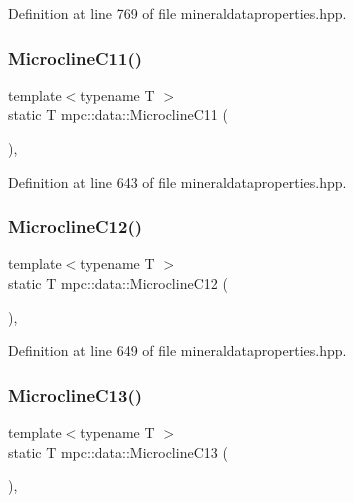 Definition at line 769 of file mineraldataproperties.\+hpp.

\mbox{\label{namespacempc_1_1data_ae1104e84795cd3422116236f70bfe596}} 
\subsubsection{\texorpdfstring{Microcline\+C11()}{MicroclineC11()}}
{\footnotesize\ttfamily template$<$typename T $>$ \\
static T mpc\+::data\+::\+Microcline\+C11 (\begin{DoxyParamCaption}{ }\end{DoxyParamCaption})\hspace{0.3cm}{\ttfamily [inline]}, {\ttfamily [static]}}



Definition at line 643 of file mineraldataproperties.\+hpp.

\mbox{\label{namespacempc_1_1data_aedb1f81db73ed10d6a42f9fce5d0727b}} 
\subsubsection{\texorpdfstring{Microcline\+C12()}{MicroclineC12()}}
{\footnotesize\ttfamily template$<$typename T $>$ \\
static T mpc\+::data\+::\+Microcline\+C12 (\begin{DoxyParamCaption}{ }\end{DoxyParamCaption})\hspace{0.3cm}{\ttfamily [inline]}, {\ttfamily [static]}}



Definition at line 649 of file mineraldataproperties.\+hpp.

\mbox{\label{namespacempc_1_1data_afa6b7fb7d0fa4a7ef3a311f67659fbc8}} 
\subsubsection{\texorpdfstring{Microcline\+C13()}{MicroclineC13()}}
{\footnotesize\ttfamily template$<$typename T $>$ \\
static T mpc\+::data\+::\+Microcline\+C13 (\begin{DoxyParamCaption}{ }\end{DoxyParamCaption})\hspace{0.3cm}{\ttfamily [inline]}, {\ttfamily [static]}}



